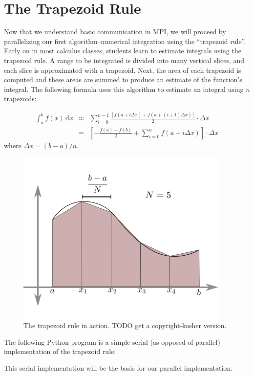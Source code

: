\section*{The Trapezoid Rule}
Now that we understand basic communication in MPI, we will proceed by
parallelizing our first algorithm--numerical integration using the ``trapezoid
rule''. Early on in most calculus classes, students learn to estimate integrals
using the trapezoid rule. A range to be integrated is divided into many
vertical slices, and each slice is approximated with a trapezoid. Next, the area
of each trapezoid is computed and these areas are summed to produce an estimate
of the function's integral. The following formula uses this algorithm to
estimate an integral using $n$ trapezoids:

\begin{eqnarray*}%
\int_{a}^{b} \! f(x) \, \mathrm{d} x
&\approx&
\sum_{i=0}^{n-1}\frac{[f(a+i \Delta x)+f(a + (i+1) \Delta x)]}{2}\cdot\Delta x \\
&=&
\left[-\frac{f(a)+f(b)}{2}+\sum_{i=0}^{n}f(a+i\Delta x)\right]\cdot\Delta x
\end{eqnarray*}
where $\Delta x=(b-a)/n$.

\begin{figure}[h]
\centering
\includegraphics[width=.5\textwidth]{trapezoid_rule_theory_placeholder.png}
\caption{The trapezoid rule in action. TODO get a copyright-kosher version.}
\label{fig:trapezoid_rule}
\end{figure}

The following Python program is a simple serial (as opposed of parallel)
implementation of the trapezoid rule:



This serial implementation will be the basis for our parallel implementation.

